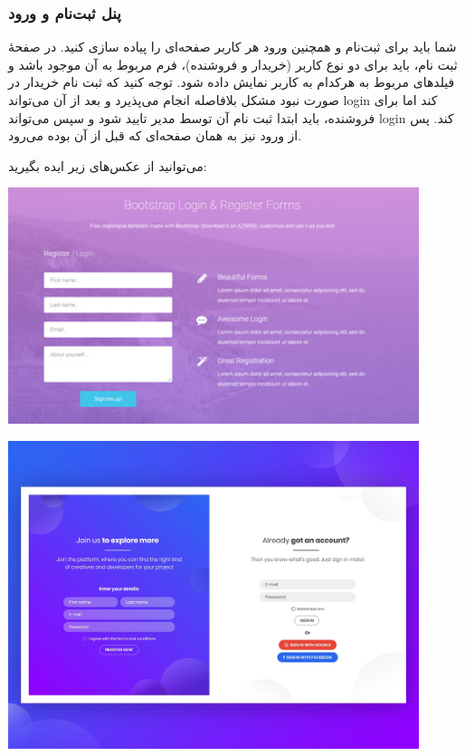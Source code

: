 \documentclass[]{article}
\begin{document}
\subsubsection*{{\titr پنل ثبت‌نام و ورود}}

شما باید برای ثبت‌نام و همچنین ورود هر کاربر صفحه‌ای را پیاده سازی کنید. در صفحه‌ٔ‌ ثبت نام، باید برای دو نوع کاربر (خریدار و فروشنده)، فرم مربوط به آن موجود باشد و فیلدهای مربوط به هرکدام به کاربر نمایش داده‌ شود. توجه کنید که ثبت نام خریدار در صورت نبود مشکل بلافاصله انجام می‌پذیرد و بعد از آن می‌تواند login کند اما برای فروشنده، باید ابتدا ثبت نام آن توسط مدیر تایید شود و سپس می‌تواند login کند. پس از ورود نیز به همان صفحه‌ای که قبل از آن بوده می‌رود.


می‌توانید از عکس‌های زیر ایده بگیرید:






\begin{center}
\includegraphics[width=0.9\textwidth]{images/image9.png}
\end{center}


\begin{center}
\includegraphics[width=0.9\textwidth]{images/image10.png}
\end{center}
\end{document}
